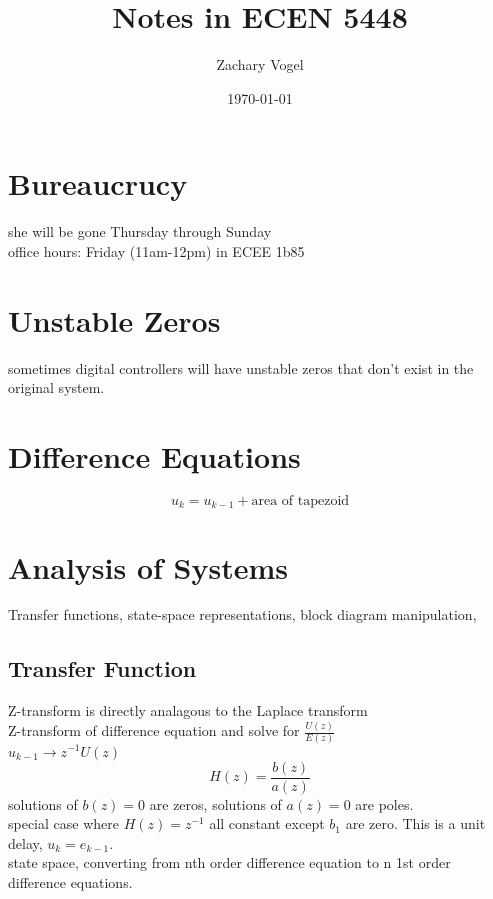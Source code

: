 \documentclass{article}
\author{Zachary Vogel}
\date{\today}
\title{Notes in ECEN 5448}
\begin{document}
\maketitle


\section*{Bureaucrucy}
she will be gone Thursday through Sunday\\
office hours: Friday (11am-12pm) in ECEE 1b85\\

\section*{Unstable Zeros}
sometimes digital controllers will have unstable zeros that don't exist in the original system.\\

\section*{Difference Equations}
\[u_k=u_{k-1}+\text{area of tapezoid}\]

\section*{Analysis of Systems}
Transfer functions, state-space representations, block diagram manipulation,\\

\subsection*{Transfer Function}
Z-transform is directly analagous to the Laplace transform\\

Z-transform of difference equation and solve for $\frac{U(z)}{E(z)}$\\

$u_{k-1}\to z^{-1}U(z)$
\[H(z)=\frac{b(z)}{a(z)}\]
solutions of $b(z)=0$ are zeros, solutions of $a(z)=0$ are poles.\\


special case where $H(z)=z^{-1}$ all constant except $b_1$ are zero. This is a unit delay, $u_k=e_{k-1}$.\\

state space, converting from nth order difference equation to n 1st order difference equations.\\
\end{document}

